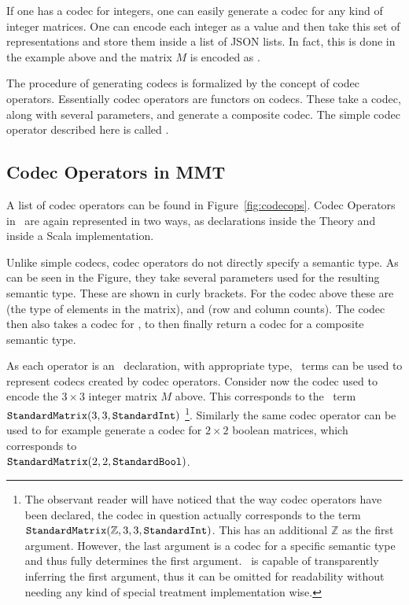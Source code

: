If one has a codec for integers, one can easily generate a codec for any kind of integer matrices. 
One can encode each integer as a value and then take this set of representations and store them inside a list of JSON lists.
In fact, this is done in the example above and the matrix $M$ is encoded as \inlinecode{[[1.0,5.0,25.0],[5.0,1.0,5.0],[25.0,5.0,1.0]]}. 

The procedure of generating codecs is formalized by the concept of codec operators. 
Essentially codec operators are functors on codecs. 
These take a codec, along with several parameters, and generate a composite codec. 
The simple codec operator described here is called . 

\subsection{Codec Operators in MMT}\label{sec:vt:operatormmt}


A list of codec operators can be found in Figure~\ref{fig:codecops}. 
Codec Operators in \mmt\ are again represented in two ways, as declarations inside the  Theory and inside a Scala implementation. 

Unlike simple codecs, codec operators do not directly specify a semantic type. 
As can be seen in the Figure, they take several parameters used for the resulting semantic type. 
These are shown in curly brackets. 
For the  codec above these are  (the type of elements in the matrix),  and  (row and column counts).
The codec then also takes a codec for , to then finally return a codec for a composite semantic type. 

As each operator is an \mmt\ declaration, with appropriate type, \mmt\ terms can be used to represent codecs created by codec operators. 
Consider now the codec used to encode the $3 \times 3$ integer matrix $M$ above. 
This corresponds to the \mmt\ term \\$\plaintt{StandardMatrix}(3, 3, \plaintt{StandardInt})$ \footnote{
  The observant reader will have noticed that the way codec operators have been declared, the codec in question actually corresponds to the term $\plaintt{StandardMatrix}(\mathbb{Z}, 3, 3, \plaintt{StandardInt})$. 
  This has an additional $\mathbb{Z}$ as the first argument. 
  However, the last argument is a codec for a specific semantic type and thus fully determines the first argument. 
  \mmt\ is capable of transparently inferring the first argument, thus it can be omitted for readability without needing any kind of special treatment implementation wise.  
}. 
Similarly the same codec operator can be used to for example generate a codec for $2 \times 2$ boolean matrices, which corresponds to 
\\$\plaintt{StandardMatrix}(2, 2, \plaintt{StandardBool})$. 

